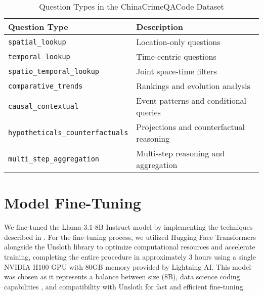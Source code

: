 
\begin{table}[hbtp]
\centering
\caption{Question Types in the ChinaCrimeQACode Dataset}
\label{tab:question_types}
\begin{tabular}{ll}
\toprule
\textbf{Question Type} & \textbf{Description} \\
\midrule
\texttt{spatial\_lookup} & Location-only questions \\
\texttt{temporal\_lookup} & Time-centric questions \\
\texttt{spatio\_temporal\_lookup} & Joint space-time filters \\
\texttt{comparative\_trends} & Rankings and evolution analysis \\
\texttt{causal\_contextual} & Event patterns and conditional queries \\
\texttt{hypotheticals\_counterfactuals} & Projections and counterfactual reasoning \\
\texttt{multi\_step\_aggregation} & Multi-step reasoning and aggregation \\
\bottomrule
\end{tabular}
\end{table}


\section{Model Fine-Tuning}


We fine-tuned the Llama-3.1-8B Instruct model \cite{Grattafiori2024Llama3, Unsloth2024WhatModel} by implementing the techniques described in \cite{Pareja2024RecipesSFT}. For the fine-tuning process, we utilized Hugging Face Transformers alongside the Unsloth library to optimize computational resources and accelerate training, completing the entire procedure in approximately 3 hours using a single NVIDIA H100 GPU with 80GB memory provided by Lightning AI. This model was chosen as it represents a balance between size (8B), data science coding capabilities \cite{Lai2022DS1000}, and compatibility with Unsloth for fast and efficient fine-tuning.

